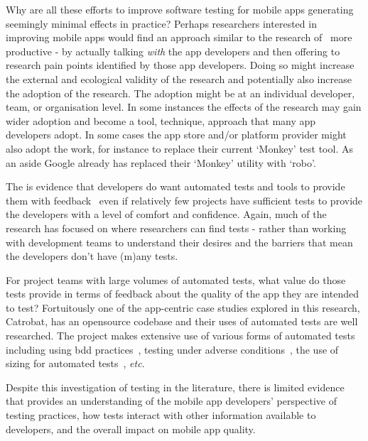 Why are all these efforts to improve software testing for mobile apps generating seemingly minimal effects in practice? Perhaps researchers interested in improving mobile apps would find an approach similar to the research of~ more productive - by actually talking \emph{with} the app developers and then offering to research pain points identified by those app developers. Doing so might increase the external and ecological validity of the research and potentially also increase the adoption of the research. The adoption might be at an individual developer, team, or organisation level. In some instances the effects of the research may gain wider adoption and become a tool, technique, approach that many app developers adopt. In some cases the app store and/or platform provider might also adopt the work, for instance to replace their current `Monkey' test tool. As an aside Google already has replaced their `Monkey' utility with `robo'.

The is evidence that developers do want automated tests and tools to provide them with feedback~ even if relatively few projects have sufficient tests to provide the developers with a level of comfort and confidence. Again, much of the research has focused on where researchers can find tests - rather than working with development teams to understand their desires and the barriers that mean the developers don't have (m)any tests.

For project teams with large volumes of automated tests, what value do those tests provide in terms of feedback about the quality of the app they are intended to test? Fortuitously one of the app-centric case studies explored in this research, Catrobat, has an opensource codebase and their uses of automated tests are well researched. The  project makes extensive use of various forms of automated tests including using \Gls{bdd} practices~, testing under adverse conditions~, the use of sizing for automated tests~, \emph{etc}. %

Despite this investigation of testing in the literature, there is limited evidence that provides an understanding of the mobile app developers' perspective of testing practices, how tests interact with other information available to developers, and the overall impact on mobile app quality.

